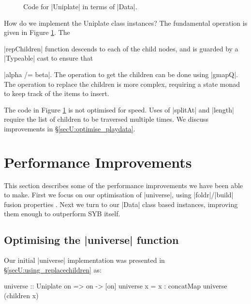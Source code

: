 \begin{figure}
\ignore{}
\caption{Code for |Uniplate| in terms of |Data|.}
\label{figU:playdata}
\end{figure}

How do we implement the Uniplate class instances? The fundamental operation is given in Figure \ref{figU:playdata}. The \ignore|repChildren| function descends to each of the child nodes, and is guarded by a |Typeable| cast to ensure that \ignore|alpha /= beta|. The operation to get the children can be done using |gmapQ|. The operation to replace the children is more complex, requiring a state monad to keep track of the items to insert.

The code in Figure \ref{figU:playdata} is not optimised for speed. Uses of |splitAt| and |length| require the list of children to be traversed multiple times. We discuss improvements in \S\ref{secU:optimise_playdata}.


\section{Performance Improvements}
\label{secU:performance}

This section describes some of the performance improvements we have been able to make. First we focus on our optimisation of |universe|, using |foldr|/|build| fusion properties \cite{spj:rules}. Next we turn to our |Data| class based instances, improving them enough to outperform SYB itself.

\subsection{Optimising the |universe| function}
\label{secU:optimise_everything}

Our initial |universe| implementation was presented in \S\ref{secU:using_replacechildren} as:

\begin{code}
universe :: Uniplate on => on -> [on]
universe x = x : concatMap universe (children x)
\end{code}


